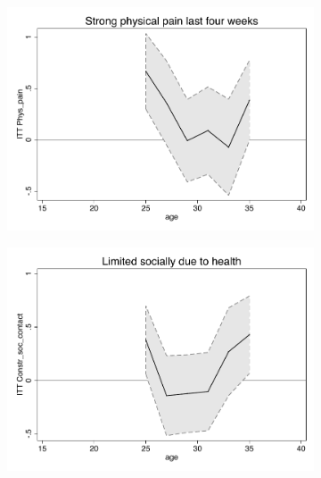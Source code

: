 \documentclass[a4paper ]{article}
\begin{document}
\begin{figure}[p]
\begin{subfigure}[h]{0.48\textwidth}\centering
	\includegraphics[width=\textwidth]{../../analysis/graphs/SOEP/Phys_pain_LC.pdf}
\end{subfigure}
\quad
\begin{subfigure}[h]{0.48\textwidth}\centering
	\includegraphics[width=\textwidth]{../../analysis/graphs/SOEP/Constr_soc_contact_LC.pdf}
\end{subfigure}



\end{figure}
\end{document}
